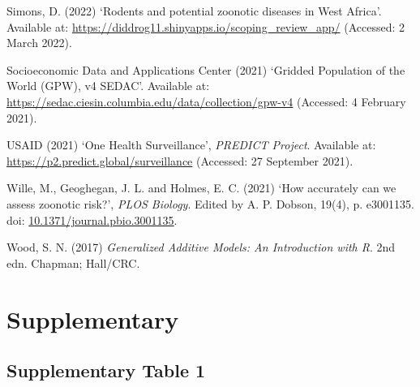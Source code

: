 \documentclass[
]{article}
\newlength{\cslhangindent}
\newlength{\cslentryspacingunit} %
\newenvironment{CSLReferences}[2] %
 {%
  \setlength{\parindent}{0pt}
  \ifodd #1
  \let\oldpar\par
  \def\par{\hangindent=\cslhangindent\oldpar}
  \fi
  \setlength{\parskip}{#2\cslentryspacingunit}
 }%
 {}
\begin{document}
\begin{CSLReferences}{0}{0}
\leavevmode{}%
Simons, D. (2022) {`Rodents and potential zoonotic diseases in {West}
{Africa}'}. Available at:
\url{https://diddrog11.shinyapps.io/scoping_review_app/} (Accessed: 2
March 2022).

\leavevmode{}%
Socioeconomic Data and Applications Center (2021) {`Gridded {Population}
of the {World} ({GPW}), v4 {\textbar} {SEDAC}'}. Available at:
\url{https://sedac.ciesin.columbia.edu/data/collection/gpw-v4}
(Accessed: 4 February 2021).

\leavevmode{}%
USAID (2021) {`One {Health} {Surveillance}'}, \emph{PREDICT Project}.
Available at: \url{https://p2.predict.global/surveillance} (Accessed: 27
September 2021).

\leavevmode{}%
Wille, M., Geoghegan, J. L. and Holmes, E. C. (2021) {`How accurately
can we assess zoonotic risk?'}, \emph{PLOS Biology}. Edited by A. P.
Dobson, 19(4), p. e3001135. doi:
\href{https://doi.org/10.1371/journal.pbio.3001135}{10.1371/journal.pbio.3001135}.

\leavevmode{}%
Wood, S. N. (2017) \emph{Generalized {Additive} {Models}: {An}
{Introduction} with {R}}. 2nd edn. Chapman; Hall/CRC.

\end{CSLReferences}

\hypertarget{supplementary}{%
\section{Supplementary}\label{supplementary}}

\hypertarget{supplementary-table-1}{%
\subsection{Supplementary Table 1}\label{supplementary-table-1}}

\providecommand{\docline}[3]{\noalign{\global\setlength{\arrayrulewidth}{#1}}\arrayrulecolor[HTML]{#2}\cline{#3}}

\setlength{\tabcolsep}{2pt}

\renewcommand*{\arraystretch}{1.5}
\end{document}
